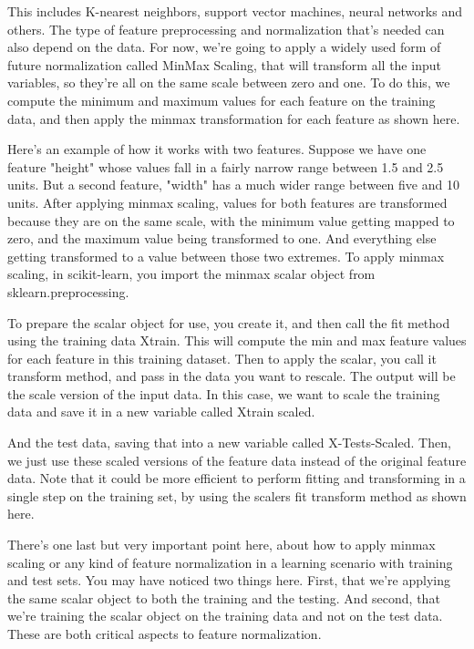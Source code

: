 \begin{multicols}{2}
This includes K-nearest neighbors, support vector machines, neural networks and others. The type of feature preprocessing and normalization that's needed can also depend on the data. For now, we're going to apply a widely used form of future normalization called MinMax Scaling, that will transform all the input variables, so they're all on the same scale between zero and one. To do this, we compute the minimum and maximum values for each feature on the training data, and then apply the minmax transformation for each feature as shown here. 

Here's an example of how it works with two features. Suppose we have one feature "height" whose values fall in a fairly narrow range between 1.5 and 2.5 units. But a second feature, "width" has a much wider range between five and 10 units. After applying minmax scaling, values for both features are transformed because they are on the same scale, with the minimum value getting mapped to zero, and the maximum value being transformed to one. And everything else getting transformed to a value between those two extremes. To apply minmax scaling, in scikit-learn, you import the minmax scalar object from sklearn.preprocessing. 

To prepare the scalar object for use, you create it, and then call the fit method using the training data Xtrain. This will compute the min and max feature values for each feature in this training dataset. Then to apply the scalar, you call it transform method, and pass in the data you want to rescale. The output will be the scale version of the input data. In this case, we want to scale the training data and save it in a new variable called Xtrain scaled. 

And the test data, saving that into a new variable called X-Tests-Scaled. Then, we just use these scaled versions of the feature data instead of the original feature data. Note that it could be more efficient to perform fitting and transforming in a single step on the training set, by using the scalers fit transform method as shown here. 

There's one last but very important point here, about how to apply minmax scaling or any kind of feature normalization in a learning scenario with training and test sets. You may have noticed two things here. First, that we're applying the same scalar object to both the training and the testing. And second, that we're training the scalar object on the training data and not on the test data. These are both critical aspects to feature normalization. 


\end{multicols}
